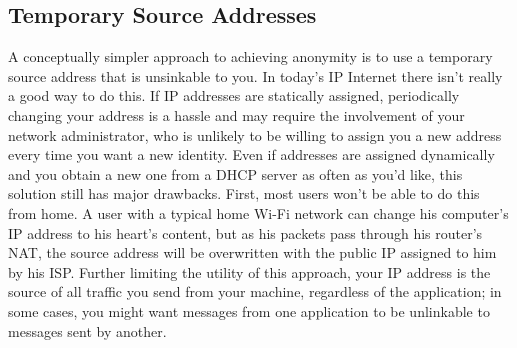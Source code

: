 \documentclass{article}
\begin{document}
\subsection{Temporary Source Addresses}
\label{temp-ids}
A conceptually simpler approach to achieving anonymity is to use a temporary source address that is unsinkable to you. In today's IP Internet there isn't really a good way to do this. If IP addresses are statically assigned, periodically changing your address is a hassle and may require the involvement of your network administrator, who is unlikely to be willing to assign you a new address every time you want a new identity. Even if addresses are assigned dynamically and you obtain a new one from a DHCP server as often as you'd like, this solution still has major drawbacks. First, most users won't be able to do this from home. A user with a typical home Wi-Fi network can change his computer's IP address to his heart's content, but as his packets pass through his router's NAT, the source address will be overwritten with the public IP assigned to him by his ISP. Further limiting the utility of this approach, your IP address is the source of all traffic you send from your machine, regardless of the application; in some cases, you might want messages from one application to be unlinkable to messages sent by another.
\end{document}
